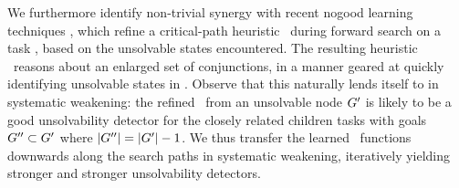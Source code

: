 %
%
%
%
%
%
%

We furthermore identify non-trivial synergy with recent nogood
learning techniques \cite{steinmetz:hoffmann:ai-17}, which refine a
critical-path heuristic \hc\ during forward search on a task \task,
based on the unsolvable states encountered. The resulting heuristic
\hc\ reasons about an enlarged set of conjunctions, in a manner geared
at quickly identifying unsolvable states in \task. Observe that this
naturally lends itself to  in systematic
weakening: the refined \hc\ from an unsolvable node $G'$ is likely
to be a good unsolvability detector for the closely related children
tasks with goals $G'' \subset G'$ where $|G''| =
|G'|-1$. We thus transfer the learned \hc\ functions downwards
along the search paths in systematic weakening, iteratively yielding
stronger and stronger unsolvability detectors.
%
%



